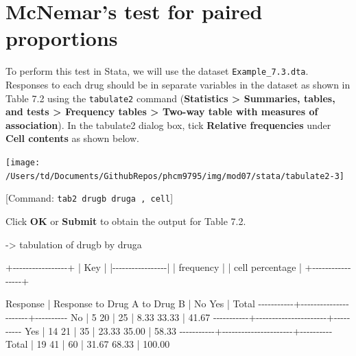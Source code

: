 \documentclass[
]{memoir}
\newenvironment{Shaded}{\begin{snugshade}}{\end{snugshade}}
\newcommand{\NormalTok}[1]{#1}
\begin{document}
\hypertarget{mcnemars-test-for-paired-proportions}{%
\section{McNemar's test for paired proportions}\label{mcnemars-test-for-paired-proportions}}

To perform this test in Stata, we will use the dataset \texttt{Example\_7.3.dta}. Responses to each drug should be in separate variables in the dataset as shown in Table 7.2 using the \texttt{tabulate2} command (\textbf{Statistics \textgreater{} Summaries, tables, and tests \textgreater{} Frequency tables \textgreater{} Two-way table with measures of association}). In the tabulate2 dialog box, tick \textbf{Relative frequencies} under \textbf{Cell contents} as shown below.

\texttt{[image: /Users/td/Documents/GithubRepos/phcm9795/img/mod07/stata/tabulate2-3]}

{[}Command: \texttt{tab2\ drugb\ druga\ ,\ cell}{]}

Click \textbf{OK} or \textbf{Submit} to obtain the output for Table 7.2.

\begin{Shaded}
\begin{Highlighting}[]
\NormalTok{{-}\textgreater{} tabulation of drugb by druga  }

\NormalTok{+{-}{-}{-}{-}{-}{-}{-}{-}{-}{-}{-}{-}{-}{-}{-}{-}{-}+}
\NormalTok{| Key             |}
\NormalTok{|{-}{-}{-}{-}{-}{-}{-}{-}{-}{-}{-}{-}{-}{-}{-}{-}{-}|}
\NormalTok{|    frequency    |}
\NormalTok{| cell percentage |}
\NormalTok{+{-}{-}{-}{-}{-}{-}{-}{-}{-}{-}{-}{-}{-}{-}{-}{-}{-}+}

\NormalTok{  Response |  Response to Drug A}
\NormalTok{ to Drug B |        No        Yes |     Total}
\NormalTok{{-}{-}{-}{-}{-}{-}{-}{-}{-}{-}{-}+{-}{-}{-}{-}{-}{-}{-}{-}{-}{-}{-}{-}{-}{-}{-}{-}{-}{-}{-}{-}{-}{-}+{-}{-}{-}{-}{-}{-}{-}{-}{-}{-}}
\NormalTok{        No |         5         20 |        25 }
\NormalTok{           |      8.33      33.33 |     41.67 }
\NormalTok{{-}{-}{-}{-}{-}{-}{-}{-}{-}{-}{-}+{-}{-}{-}{-}{-}{-}{-}{-}{-}{-}{-}{-}{-}{-}{-}{-}{-}{-}{-}{-}{-}{-}+{-}{-}{-}{-}{-}{-}{-}{-}{-}{-}}
\NormalTok{       Yes |        14         21 |        35 }
\NormalTok{           |     23.33      35.00 |     58.33 }
\NormalTok{{-}{-}{-}{-}{-}{-}{-}{-}{-}{-}{-}+{-}{-}{-}{-}{-}{-}{-}{-}{-}{-}{-}{-}{-}{-}{-}{-}{-}{-}{-}{-}{-}{-}+{-}{-}{-}{-}{-}{-}{-}{-}{-}{-}}
\NormalTok{     Total |        19         41 |        60 }
\NormalTok{           |     31.67      68.33 |    100.00 }
\end{Highlighting}
\end{Shaded}
\end{document}
